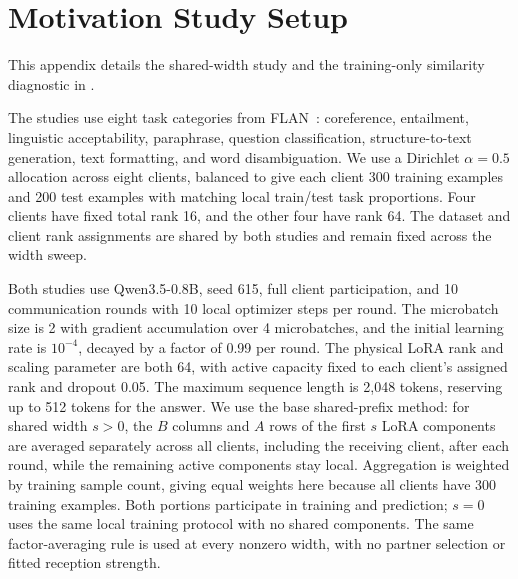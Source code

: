 \newpage
\appendix

\section{Motivation Study Setup}
\label{sec:appendix:motivation-setup}


This appendix details the shared-width study and the training-only similarity diagnostic in .

The studies use eight task categories from FLAN~\cite{wei2022finetuned}: coreference, entailment, linguistic acceptability, paraphrase, question classification, structure-to-text generation, text formatting, and word disambiguation.
We use a Dirichlet $\alpha=0.5$ allocation across eight clients, balanced to give each client 300 training examples and 200 test examples with matching local train/test task proportions.
Four clients have fixed total rank 16, and the other four have rank 64.
The dataset and client rank assignments are shared by both studies and remain fixed across the width sweep.

Both studies use Qwen3.5-0.8B, seed 615, full client participation, and 10 communication rounds with 10 local optimizer steps per round.
The microbatch size is 2 with gradient accumulation over 4 microbatches, and the initial learning rate is $10^{-4}$, decayed by a factor of 0.99 per round.
The physical LoRA rank and scaling parameter are both 64, with active capacity fixed to each client's assigned rank and dropout 0.05.
The maximum sequence length is 2,048 tokens, reserving up to 512 tokens for the answer.
We use the base shared-prefix method: for shared width $s>0$, the $B$ columns and $A$ rows of the first $s$ LoRA components are averaged separately across all clients, including the receiving client, after each round, while the remaining active components stay local.
Aggregation is weighted by training sample count, giving equal weights here because all clients have 300 training examples.
Both portions participate in training and prediction; $s=0$ uses the same local training protocol with no shared components.
The same factor-averaging rule is used at every nonzero width, with no partner selection or fitted reception strength.

